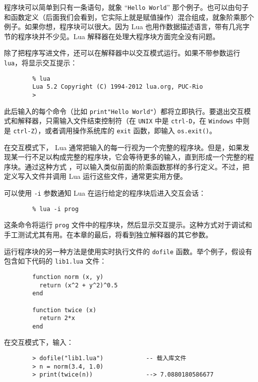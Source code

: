 程序块可以简单到只有一条语句，就象 ``\verb|Hello World|'' 那个例子。也可以由句子和函数定义（后面我们会看到，它实际上就是赋值操作）混合组成，就象阶乘那个例子。如果你想，程序块可以很大。因为 Lua 也用作数据描述语言，带有几兆字节的程序块并不少见。Lua 解释器在处理大程序块方面完全没有问题。

除了把程序写进文件，还可以在解释器中以交互模式运行。如果不带参数运行 \verb|lua|，将显示交互提示：

\begin{verbatim}
        % lua  
        Lua 5.2 Copyright (C) 1994-2012 lua.org, PUC-Rio
        >
\end{verbatim}

此后输入的每个命令（比如 \verb|print"Hello World"|）都将立即执行。要退出交互模式和解释器，只需输入文件结束控制符（在 \verb|UNIX| 中是 \verb|ctrl-D|，在 \verb|Windows| 中则是 \verb|ctrl-Z|），或者调用操作系统库的 \verb|exit| 函数，即输入 \verb|os.exit()|。

在交互模式下， Lua 通常把输入的每一行视为一个完整的程序块。但是，如果发现某一行不足以构成完整的程序块，它会等待更多的输入，直到形成一个完整的程序块。通过这种方式 ，可以输入类似前面的阶乘函数那样的多行定义。不过，把定义写入文件并调用 Lua 运行这些文件，通常更实用方便。

可以使用 \verb|-i| 参数通知 Lua 在运行给定的程序块后进入交互会话：

\begin{verbatim}
        % lua -i prog
\end{verbatim}

这条命令将运行 \verb|prog| 文件中的程序块，然后显示交互提示。这种方式对于调试和手工测试尤其有用。在本章的最后，将看到独立解释器的其它参数。

运行程序块的另一种方法是使用实时执行文件的 \verb|dofile| 函数。举个例子，假设有包含如下代码的 \verb|lib1.lua| 文件：

\begin{verbatim}
        function norm (x, y)
          return (x^2 + y^2)^0.5
        end

        function twice (x)
          return 2*x
        end
\end{verbatim}

在交互模式下，输入：

\begin{verbatim}
        > dofile("lib1.lua")            -- 载入库文件
        > n = norm(3.4, 1.0)
        > print(twice(n))               --> 7.0880180586677
\end{verbatim}

